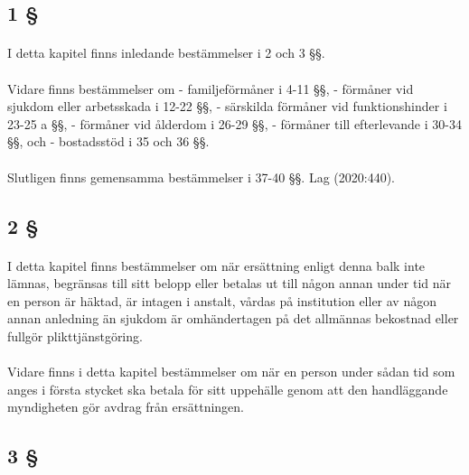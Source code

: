 \documentclass[a4paper,notitlepage,openany,10pt]{book}
\begin{document}
\subsection*{1 §}
\paragraph*{}
I detta kapitel finns inledande bestämmelser i 2 och 3 §§.
\paragraph*{}
Vidare finns bestämmelser om
\newline - familjeförmåner i 4-11 §§,
\newline - förmåner vid sjukdom eller arbetsskada i 12-22 §§,
\newline - särskilda förmåner vid funktionshinder i 23-25 a §§,
\newline - förmåner vid ålderdom i 26-29 §§,
\newline - förmåner till efterlevande i 30-34 §§, och
\newline - bostadsstöd i 35 och 36 §§.
\paragraph*{}
Slutligen finns gemensamma bestämmelser i 37-40 §§.
Lag (2020:440).
\subsection*{2 §}
\paragraph*{}
I detta kapitel finns bestämmelser om när ersättning enligt denna balk inte lämnas, begränsas till sitt belopp eller betalas ut till någon annan under tid när en person är häktad, är intagen i anstalt, vårdas på institution eller av någon annan anledning än sjukdom är omhändertagen på det allmännas bekostnad eller fullgör plikttjänstgöring.
\paragraph*{}
Vidare finns i detta kapitel bestämmelser om när en person under sådan tid som anges i första stycket ska betala för sitt uppehälle genom att den handläggande myndigheten gör avdrag från ersättningen.
\subsection*{3 §}
\end{document}
